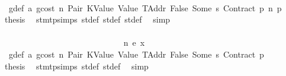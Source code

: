 \begin{isabellebody}
\ \ \ \ \ \ \ \ \ \ \ \ \ \ \ \ \ \ \ \ \ \ \ \ \ \ \ \ \ \ \ \ \isamarkupfalse%
\ {}{\isacharparenleft}{\kern0pt}{}{\isacharparenright}{\kern0pt}\ g{\isacharunderscore}{\kern0pt}def\ a{}\ gcost\ n\ Pair\ KValue\ Value\ TAddr\ False\ Some\ s{}\ Contract\ p{}\ n{}\ p{}\ \isamarkupfalse%
\ {\isacharquery}{\kern0pt}thesis\ \isamarkupfalse%
\ stmt{\isachardot}{\kern0pt}psimps{\isacharparenleft}{\kern0pt}{}{\isacharparenright}{\kern0pt}\ st{\isacharprime}{\kern0pt}{\isacharunderscore}{\kern0pt}def\ st{\isacharprime}{\kern0pt}{\isacharprime}{\kern0pt}{\isacharunderscore}{\kern0pt}def\ st{\isacharprime}{\kern0pt}{\isacharprime}{\kern0pt}{\isacharprime}{\kern0pt}{\isacharunderscore}{\kern0pt}def\ \isamarkupfalse%
\ simp\isanewline
\ \ \ \ \ \ \ \ \ \ \ \ \ \ \ \ \ \ \ \ \ \ \ \ \ \ \ \ \ \ \isamarkupfalse%
\isanewline
\ \ \ \ \ \ \ \ \ \ \ \ \ \ \ \ \ \ \ \ \ \ \ \ \ \ \ \ \isamarkupfalse%
\isanewline
\ \ \ \ \ \ \ \ \ \ \ \ \ \ \ \ \ \ \ \ \ \ \ \ \ \ \isamarkupfalse%
\isanewline
\ \ \ \ \ \ \ \ \ \ \ \ \ \ \ \ \ \ \ \ \ \ \ \ \ \ \ \ \isamarkupfalse%
\ n{}{\isacharcolon}{\kern0pt}\ {\isacharparenleft}{\kern0pt}e\ x{\isacharparenright}{\kern0pt}\isanewline
\ \ \ \ \ \ \ \ \ \ \ \ \ \ \ \ \ \ \ \ \ \ \ \ \ \ \ \ \isamarkupfalse%
\ {}{\isacharparenleft}{\kern0pt}{}{\isacharparenright}{\kern0pt}\ g{\isacharunderscore}{\kern0pt}def\ a{}\ gcost\ n\ Pair\ KValue\ Value\ TAddr\ False\ Some\ s{}\ Contract\ p{}\ \isamarkupfalse%
\ {\isacharquery}{\kern0pt}thesis\ \isamarkupfalse%
\ stmt{\isachardot}{\kern0pt}psimps{\isacharparenleft}{\kern0pt}{}{\isacharparenright}{\kern0pt}\ st{\isacharprime}{\kern0pt}{\isacharunderscore}{\kern0pt}def\ st{\isacharprime}{\kern0pt}{\isacharprime}{\kern0pt}{\isacharunderscore}{\kern0pt}def\ \isamarkupfalse%
\ simp\isanewline
\ \ \ \ \ \ \ \ \ \ \ \ \ \ \ \ \ \ \ \ \ \ \ \ \ \ \isamarkupfalse%
\isanewline
\ \ \ \ \ \ \ \ \ \ \ \ \ \ \ \ \ \ \ \ \ \ \ \ \isamarkupfalse%
\isanewline
\ \ \ \ \ \ \ \ \ \ \ \ \ \ \ \ \ \ \ \ \ \ \isamarkupfalse%
\isanewline
\ \ \ \ \ \ \ \ \ \ \ \ \ \ \ \ \ \ \ \ \isamarkupfalse%
\isanewline
\ \ \ \ \ \ \ \ \ \ \ \ \ \ \ \ \ \ \isamarkupfalse%
\isanewline
\ \ \ \ \ \ \ \ \ \ \ \ \ \ \ \ \isamarkupfalse%

\end{isabellebody}
